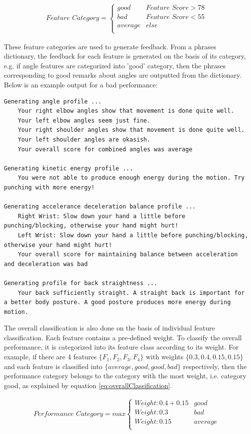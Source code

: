 \begin{align}
  \textit{Feature Category} = 
  \begin{cases}
    \textit{good} & \textit{Feature Score} > 78 \\
    \textit{bad} & \textit{Feature Score} < 55 \\
    \textit{average} & \textit{else}  \\
  \end{cases}
  \label{eq:classification}
\end{align}

These feature categories are used to generate feedback. From a phrases dictionary, the feedback for each feature is generated on the basis of its category, e.g. if angle features are categorized into 'good' category, then the phrases corresponding to good remarks about angles are outputted from the dictionary. Below is an example output for a bad performance:


\begin{lstlisting}
Generating angle profile ... 
	Your right elbow angles show that movement is done quite well.
	Your left elbow angles seem just fine.
	Your right shoulder angles show that movement is done quite well.
	Your left shoulder angles are okasish.
	Your overall score for combined angles was average

Generating kinetic energy profile ... 
	You were not able to produce enough energy during the motion. Try punching with more energy!

Generating accelerance deceleration balance profile ... 
	Right Wrist: Slow down your hand a little before punching/blocking, otherwise your hand might hurt!
	Left Wrist: Slow down your hand a little before punching/blocking, otherwise your hand might hurt!
	Your overall score for maintaining balance between acceleration and deceleration was bad

Generating profile for back straightness ... 
	Your back sufficiently straight. A straight back is important for a better body posture. A good posture produces more energy during motion.
\end{lstlisting}

The overall classification is also done on the basis of individual feature classification. Each feature contains a pre-defined weight. To classify the overall performance, it is categorized into its feature class according to its weight. For example, if there are 4 features $\{F_1, F_2, F_3,F_4\}$ with weights $\{0.3, 0.4, 0.15, 0.15\}$ and each feature is classified into $\{\textit{average}, \textit{good}, \textit{good},\textit{bad}\}$ respectively, then the performance category belongs to the category with the most weight, i.e. category good, as explained by equation \ref{eq:overallClassification}. 

\begin{align}
  \textit{Performance Category} = max
  \begin{cases}
    Weight: 0.4 + 0.15 & \textit{good} \\
    Weight: 0.3 & \textit{bad}  \\
    Weight: 0.15 & \textit{average} \\
  \end{cases} 
  \label{eq:overallClassification}
\end{align}




 
